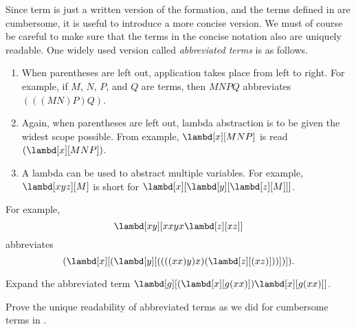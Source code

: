 \documentclass[../../../include/open-logic-section]{subfiles}
\begin{document}

Since term is just a written version of the formation, and the terms
defined in  are cumbersome, it is useful to
introduce a more concise version. We must of course be careful to make
sure that the terms in the concise notation also are uniquely
readable.  One widely used version called \emph{abbreviated terms} is
as follows.

\begin{enumerate}
\item When parentheses are left out, application takes place from left
  to right. For example, if $M$, $N$, $P$, and $Q$ are terms, then
  $MNPQ$ abbreviates $(((MN)P)Q)$.
\item Again, when parentheses are left out, lambda abstraction is to
  be given the widest scope possible. From example, $\lambd[x][MNP]$ is
  read $(\lambd[x][MNP])$.
\item A lambda can be used to abstract multiple variables. For
  example, $\lambd[xyz][M]$ is short for
  $\lambd[x][\lambd[y][\lambd[z][M]]]$.
\end{enumerate}

For example,
\[
\lambd[xy][xxyx \lambd[z][xz]]
\]
abbreviates
\[
(\lambd[x][(\lambd[y][((((xx)y)x)(\lambd[z][(xz)]))])]).
\]

\begin{prob}
Expand the abbreviated term $\lambd[g][(\lambd[x][g (x x)])
  \lambd[x][g (x x)]]$.
\end{prob}

\begin{prob}
  Prove the unique readability of abbreviated terms as we did for
  cumbersome terms in .
\end{prob}
\end{document}
